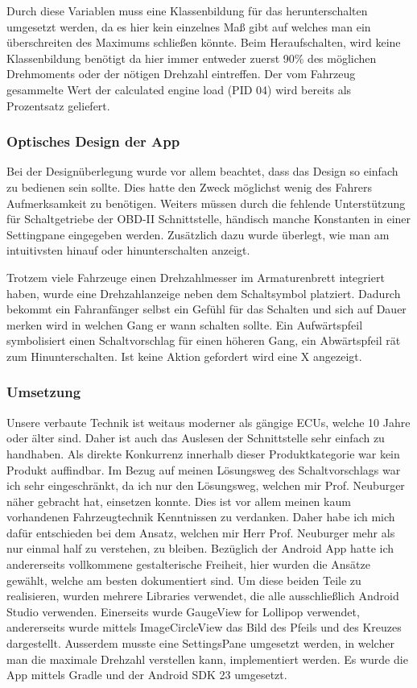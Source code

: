 Durch diese Variablen muss eine Klassenbildung für das herunterschalten umgesetzt werden, da es hier kein einzelnes Maß gibt auf welches man ein überschreiten des Maximums schließen könnte. Beim Heraufschalten, wird keine Klassenbildung benötigt da hier immer entweder zuerst 90\% des möglichen Drehmoments oder der nötigen Drehzahl eintreffen. Der vom Fahrzeug gesammelte Wert der calculated engine load (PID 04) wird bereits als Prozentsatz geliefert.
\subsubsection{Optisches Design der App} 
Bei der Designüberlegung wurde vor allem beachtet, dass das Design so einfach zu bedienen sein sollte. Dies hatte den Zweck möglichst wenig des Fahrers Aufmerksamkeit zu benötigen. Weiters müssen durch die fehlende Unterstützung für Schaltgetriebe der OBD-II Schnittstelle, händisch manche Konstanten in einer Settingpane eingegeben werden. Zusätzlich dazu wurde überlegt, wie man am intuitivsten hinauf oder hinunterschalten anzeigt.


Trotzem viele Fahrzeuge einen Drehzahlmesser im Armaturenbrett integriert haben, wurde eine Drehzahlanzeige neben dem Schaltsymbol platziert. Dadurch bekommt ein Fahranfänger selbst ein Gefühl für das Schalten und sich auf Dauer merken wird in welchen Gang er wann schalten sollte. Ein Aufwärtspfeil symbolisiert einen Schaltvorschlag für einen höheren Gang, ein Abwärtspfeil rät zum Hinunterschalten. Ist keine Aktion gefordert wird eine X angezeigt.

\subsubsection{Umsetzung}
Unsere verbaute Technik ist weitaus moderner als gängige ECUs, welche 10 Jahre oder älter sind. Daher ist auch das Auslesen der Schnittstelle sehr einfach zu handhaben. Als direkte Konkurrenz innerhalb dieser Produktkategorie war kein Produkt auffindbar.
Im Bezug auf meinen Lösungsweg des Schaltvorschlags war ich sehr eingeschränkt, da ich nur den Lösungsweg, welchen mir Prof. Neuburger näher gebracht hat, einsetzen konnte. Dies ist vor allem meinen kaum vorhandenen Fahrzeugtechnik Kenntnissen zu verdanken. Daher habe ich mich dafür entschieden bei dem Ansatz, welchen mir Herr Prof. Neuburger mehr als nur einmal half zu verstehen, zu bleiben. Bezüglich der Android App hatte ich andererseits vollkommene gestalterische Freiheit, hier wurden die Ansätze gewählt, welche am besten dokumentiert sind.
Um diese beiden Teile zu realisieren, wurden mehrere Libraries verwendet, die alle ausschließlich Android Studio verwenden.
Einerseits wurde GaugeView for Lollipop \cite{SIMR.CH3-schaltvorschlag.GaugeView} verwendet, andererseits wurde mittels ImageCircleView \cite{SIMR.CH3-schaltvorschlag.CircleImageView} das Bild des Pfeils und des Kreuzes dargestellt.
Ausserdem musste eine SettingsPane umgesetzt werden, in welcher man die maximale Drehzahl verstellen kann, implementiert werden.
Es wurde die App mittels Gradle und der Android SDK 23 umgesetzt.

